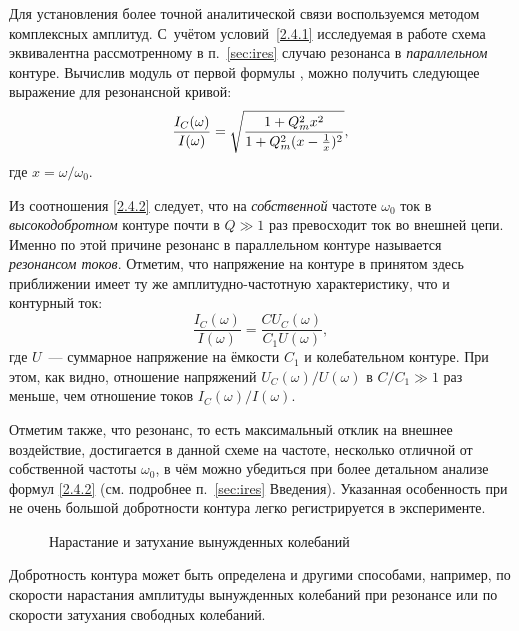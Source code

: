 Для установления более точной аналитической связи воспользуемся 
методом комплексных амплитуд. С~учётом условий~\eqref{2.4.1} 
исследуемая в работе схема эквивалентна рассмотренному в п.~\ref{sec:ires} 
случаю резонанса в \emph{параллельном} контуре. 
Вычислив модуль от первой формулы , можно получить 
следующее выражение
для резонансной кривой:
\begin{equation}
\eqmark{2.4.2}
\frac{I_C(\omega)}{I(\omega)} = 
\sqrt{\frac{1+Q_m^2x^2}{1+Q_m^2(x-\frac1x)^2}},
\end{equation}
где $x=\omega/\omega_0$.

Из соотношения \eqref{2.4.2} следует, 
что на \emph{собственной} частоте $\omega_0$ ток в \emph{высокодобротном} 
контуре почти в $Q\gg 1$ раз превосходит ток во внешней цепи. 
Именно по этой причине резонанс в параллельном контуре называется 
\emph{резонансом токов}. 
Отметим, что напряжение на контуре в принятом здесь приближении имеет ту 
же амплитудно-частотную характеристику, что и контурный ток:
\[
\frac{I_C(\omega)}{I(\omega)} = \frac{CU_C(\omega)}{C_1 U(\omega)},
\]
где $U$~--- суммарное напряжение на ёмкости $C_1$ и колебательном контуре.
При этом, как видно, отношение напряжений $U_C(\omega)/U(\omega)$ в $C/C_1\gg1$ 
раз меньше, чем отношение токов $I_C(\omega)/I(\omega)$.

Отметим также, что резонанс, то есть максимальный отклик на внешнее воздействие, 
достигается в данной схеме на частоте, несколько отличной от собственной частоты 
$\omega_0$, в чём можно убедиться при более детальном анализе формул \eqref{2.4.2}
(см. подробнее п.~\ref{sec:ires} Введения). 
Указанная особенность при не очень большой добротности контура легко регистрируется 
в эксперименте.



\begin{figure}
    \centering
    \caption{Нарастание и затухание вынужденных колебаний}
\end{figure}

Добротность контура может быть определена и другими способами, например, 
по скорости нарастания амплитуды вынужденных колебаний при резонансе 
или по скорости затухания свободных колебаний. 

